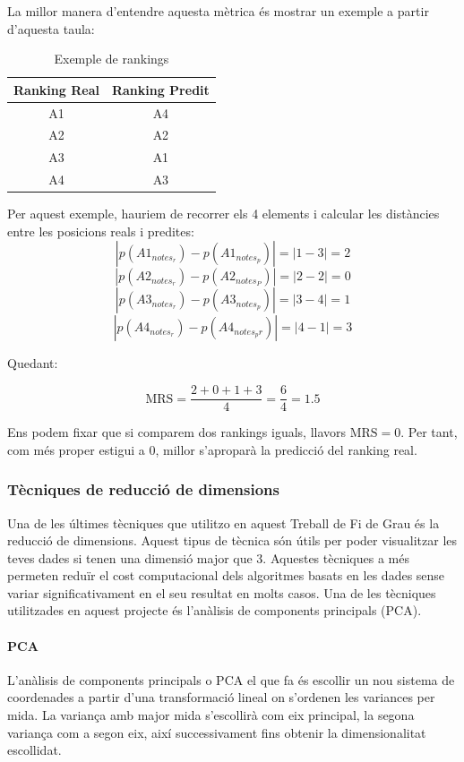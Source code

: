\documentclass[12pt,a4paper,catalan]{article}
\begin{document}
La millor manera d'entendre aquesta mètrica és mostrar un exemple a partir d'aquesta taula:

\begin{table}[h]
\centering
\begin{tabular}{@{}cc@{}}
\toprule
Ranking Real & Ranking Predit \\ \midrule
A1           & A4             \\
A2           & A2             \\
A3           & A1             \\
A4           & A3             \\ \bottomrule
\end{tabular}
\caption{Exemple de rankings}
\end{table}

Per aquest exemple, hauriem de recorrer els 4 elements i calcular les distàncies entre les posicions reals i predites:
	$$\left|p(A1_{notes_r}) - p(A1_{notes_p})\right| = \left| 1 - 3 \right| = 2$$
	$$\left|p(A2_{notes_r}) - p(A2_{notes_P})\right| = \left| 2 - 2 \right| = 0$$
	$$\left|p(A3_{notes_r}) - p(A3_{notes_p})\right| = \left| 3 - 4 \right| = 1$$
	$$\left|p(A4_{notes_r}) - p(A4_{notes_pr})\right| = \left| 4 - 1 \right| = 3$$

Quedant:

$$ \mathrm{MRS} = \frac{2 + 0 + 1 + 3}{4} = \frac{6}{4} = 1.5$$

Ens podem fixar que si comparem dos rankings iguals, llavors $\mathrm{MRS} = 0$. Per tant, com més proper estigui a 0, millor s'aproparà la predicció del ranking real.

\subsubsection{Tècniques de reducció de dimensions}
Una de les últimes tècniques que utilitzo en aquest Treball de Fi de Grau és la reducció de dimensions. Aquest tipus de tècnica són útils per poder visualitzar les teves dades si tenen una dimensió major que 3. Aquestes tècniques a més permeten reduïr el cost computacional dels algoritmes basats en les dades sense variar significativament en el seu resultat en molts casos. Una de les tècniques utilitzades en aquest projecte és l'anàlisis de components principals (PCA).

\paragraph{PCA}
L'anàlisis de components principals o PCA \cite{pca} el que fa és escollir un nou sistema de coordenades a partir d'una transformació lineal on s'ordenen les variances per mida. La variança amb major mida s'escollirà com eix principal, la segona variança com a segon eix, així successivament fins obtenir la dimensionalitat escollidat.
\end{document}
